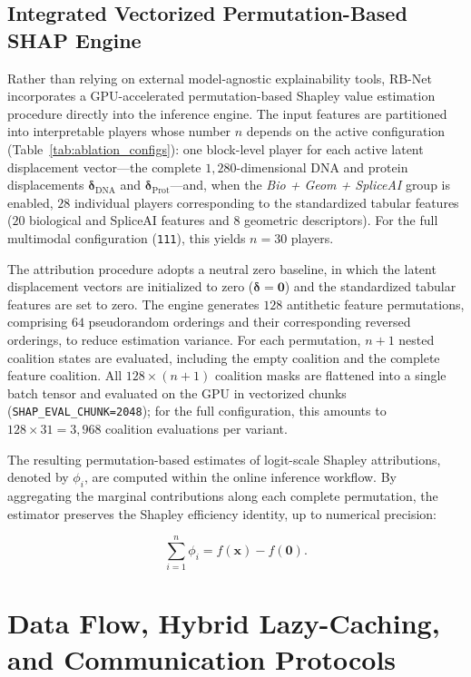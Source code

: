 \subsection{Integrated Vectorized Permutation-Based SHAP Engine}

Rather than relying on external model-agnostic explainability tools, RB-Net incorporates a GPU-accelerated permutation-based Shapley value estimation procedure directly into the inference engine. The input features are partitioned into interpretable players whose number $n$ depends on the active configuration (Table~\ref{tab:ablation_configs}): one block-level player for each active latent displacement vector---the complete $1{,}280$-dimensional DNA and protein displacements $\boldsymbol{\delta}_{\text{DNA}}$ and $\boldsymbol{\delta}_{\text{Prot}}$---and, when the \textit{Bio + Geom + SpliceAI} group is enabled, $28$ individual players corresponding to the standardized tabular features ($20$ biological and SpliceAI features and $8$ geometric descriptors). For the full multimodal configuration (\texttt{111}), this yields $n = 30$ players.

The attribution procedure adopts a neutral zero baseline, in which the latent displacement vectors are initialized to zero ($\boldsymbol{\delta} = \mathbf{0}$) and the standardized tabular features are set to zero. The engine generates $128$ antithetic feature permutations, comprising $64$ pseudorandom orderings and their corresponding reversed orderings, to reduce estimation variance. For each permutation, $n + 1$ nested coalition states are evaluated, including the empty coalition and the complete feature coalition. All $128 \times (n + 1)$ coalition masks are flattened into a single batch tensor and evaluated on the GPU in vectorized chunks (\texttt{SHAP\_EVAL\_CHUNK=2048}); for the full configuration, this amounts to $128 \times 31 = 3{,}968$ coalition evaluations per variant.

The resulting permutation-based estimates of logit-scale Shapley attributions, denoted by $\phi_i$, are computed within the online inference workflow. By aggregating the marginal contributions along each complete permutation, the estimator preserves the Shapley efficiency identity, up to numerical precision:

\[
    \sum_{i=1}^{n} \phi_i = f(\mathbf{x}) - f(\mathbf{0}).
\]



\section{Data Flow, Hybrid Lazy-Caching, and Communication Protocols}
\label{sec:data_flow_caching}

